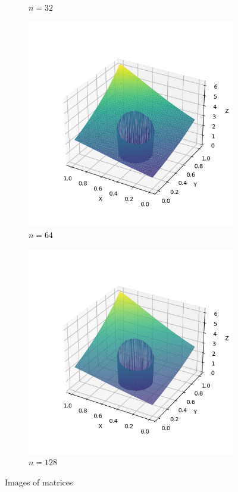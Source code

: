 \documentclass[lang=cn,a4paper,newtx,bibend=bibtex]{elegantpaper}
\begin{document}
\begin{figure}[H]
\begin{subfigure}[b]{0.18\textwidth}
      \caption{$n = 32$}
  \end{subfigure}
  \hfill
  \begin{subfigure}[b]{0.18\textwidth}
      \includegraphics[width=\textwidth]{../../res_bac/res-[data|1-Dirichlet-irregular-d64].png}
      \caption{$n = 64$}
  \end{subfigure}
  \hfill
  \begin{subfigure}[b]{0.18\textwidth}
      \includegraphics[width=\textwidth]{../../res_bac/res-[data|1-Dirichlet-irregular-e128].png}
      \caption{$n = 128$}
  \end{subfigure}
  \caption{Images of matrices}\label{fig:matrices}
\end{figure}
\end{document}
